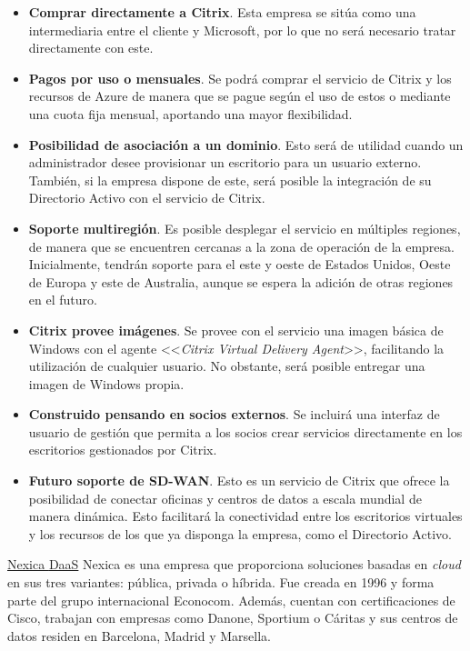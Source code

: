 \begin{itemize}
    \item \textbf{Comprar directamente a Citrix}. Esta empresa se sitúa como una intermediaria entre el cliente y Microsoft, por lo que no será necesario tratar directamente con este.
    
    \item \textbf{Pagos por uso o mensuales}. Se podrá comprar el servicio de Citrix y los recursos de Azure de manera que se pague según el uso de estos o mediante una cuota fija mensual, aportando una mayor flexibilidad.
    
    \item \textbf{Posibilidad de asociación a un dominio}. Esto será de utilidad cuando un administrador desee provisionar un escritorio para un usuario externo. También, si la empresa dispone de este, será posible la integración de su Directorio Activo con el servicio de Citrix.
    
    \item \textbf{Soporte multiregión}. Es posible desplegar el servicio en múltiples regiones, de manera que se encuentren cercanas a la zona de operación de la empresa. Inicialmente, tendrán soporte para el este y oeste de Estados Unidos, Oeste de Europa y este de Australia, aunque se espera la adición de otras regiones en el futuro.
    
    \item \textbf{Citrix provee imágenes}. Se provee con el servicio una imagen básica de Windows con el agente <<\textit{Citrix Virtual Delivery Agent}>>, facilitando la utilización de cualquier usuario. No obstante, será posible entregar una imagen de Windows propia.
    
    \item \textbf{Construido pensando en socios externos}. Se incluirá una interfaz de usuario de gestión que permita a los socios crear servicios directamente en los escritorios gestionados por Citrix.
    
    \item \textbf{Futuro soporte de \acf{SD-WAN}}. Esto es un servicio de Citrix que ofrece la posibilidad de conectar oficinas y centros de datos a escala mundial de manera dinámica. Esto facilitará la conectividad entre los escritorios virtuales y los recursos de los que ya disponga la empresa, como el Directorio Activo.
\end{itemize}

\noindent\underline{Nexica \acs{DaaS}}\newline
\indent Nexica \cite{nexicaabout} es una empresa que proporciona soluciones basadas en \textit{cloud} en sus tres variantes: pública, privada o híbrida. Fue creada en 1996 y forma parte del grupo internacional Econocom. Además, cuentan con certificaciones de Cisco, trabajan con empresas como Danone, Sportium o Cáritas y sus centros de datos residen en Barcelona, Madrid y Marsella.


